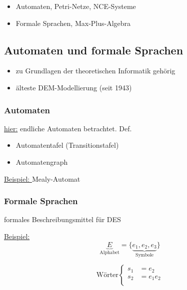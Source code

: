 \begin{itemize}
	\item Automaten, Petri-Netze, NCE-Systeme
	\item Formale Sprachen, Max-Plus-Algebra
\end{itemize}

\subsection{Automaten und formale Sprachen}
\begin{itemize}
	\item zu Grundlagen der theoretischen Informatik gehörig
	\item älteste DEM-Modellierung (seit 1943)
\end{itemize}

\subsubsection{Automaten}
\underline{hier:} endliche Automaten betrachtet. Def. 

\begin{itemize}
	\item Automatentafel (Transitionstafel)
	\item Automatengraph 
\end{itemize}

\underline{Beispiel: } Mealy-Automat 

\subsubsection{Formale Sprachen}
formales Beschreibungsmittel für DES


\underline{Beispiel:}
\begin{equation}
	\underbrace{E}_\text{Alphabet} = \{\underbrace{e_1, e_2, e_3}_\text{Symbole}\}
\end{equation}

\begin{equation}
\text{Wörter}\left\{
\begin{aligned}
s_1 &= e_2 \\
s_2 &= e_1 e_2 \\
\end{aligned}
\right.
\end{equation}

